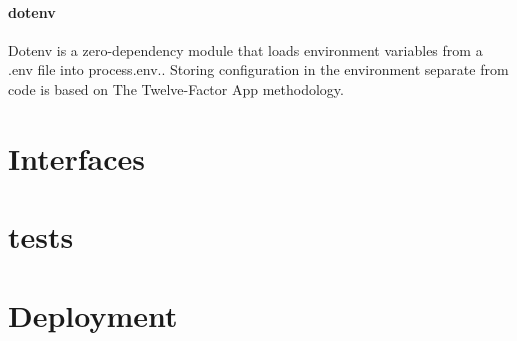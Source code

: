 \paragraph*{dotenv}
Dotenv is a zero-dependency module that loads environment variables from a .env file into process.env.. Storing configuration in the environment separate from code is based on The Twelve-Factor App methodology.



\section{Interfaces}

\section{tests}


\section{Deployment}

